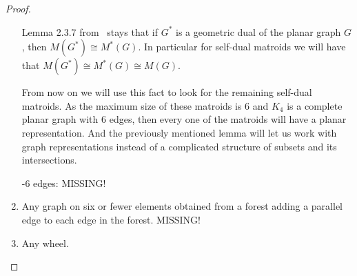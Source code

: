 \begin{proof}
\begin{enumerate}[label=(\roman*)]
            Lemma 2.3.7 from~\cite{Oxley} stays that if $G^*$ is a geometric dual of the planar graph $G$, then
            $M(G^*) \cong M^*(G)$. In particular for self-dual matroids we will have that $M(G^*) \cong M^*(G) \cong M(G)$.
            
            From now on we will use this fact to look for the remaining self-dual matroids. As the maximum size of these matroids
            is $6$ and $K_4$ is a complete planar graph with 6 edges, then every one of the matroids will have a planar representation. And the
            previously mentioned lemma will let us work with graph representations instead of a complicated structure of subsets and its 
            intersections.\pn
            
            -6 edges:\pn
            MISSING!
        \item 
            Any graph on six or fewer elements obtained from a forest adding a parallel edge to each edge in the forest.
            MISSING!
            
        \item 
            Any wheel.
    \end{enumerate}
\end{proof}